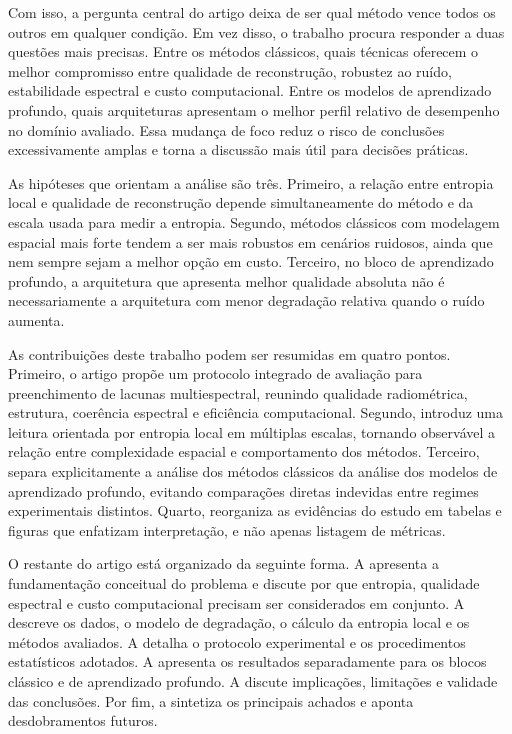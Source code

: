 Com isso, a pergunta central do artigo deixa de ser qual método vence todos os outros em qualquer condição.
Em vez disso, o trabalho procura responder a duas questões mais precisas.
Entre os métodos clássicos, quais técnicas oferecem o melhor compromisso entre qualidade de reconstrução, robustez ao ruído, estabilidade espectral e custo computacional.
Entre os modelos de aprendizado profundo, quais arquiteturas apresentam o melhor perfil relativo de desempenho no domínio avaliado.
Essa mudança de foco reduz o risco de conclusões excessivamente amplas e torna a discussão mais útil para decisões práticas.

As hipóteses que orientam a análise são três.
Primeiro, a relação entre entropia local e qualidade de reconstrução depende simultaneamente do método e da escala usada para medir a entropia.
Segundo, métodos clássicos com modelagem espacial mais forte tendem a ser mais robustos em cenários ruidosos, ainda que nem sempre sejam a melhor opção em custo.
Terceiro, no bloco de aprendizado profundo, a arquitetura que apresenta melhor qualidade absoluta não é necessariamente a arquitetura com menor degradação relativa quando o ruído aumenta.

As contribuições deste trabalho podem ser resumidas em quatro pontos.
Primeiro, o artigo propõe um protocolo integrado de avaliação para preenchimento de lacunas multiespectral, reunindo qualidade radiométrica, estrutura, coerência espectral e eficiência computacional.
Segundo, introduz uma leitura orientada por entropia local em múltiplas escalas, tornando observável a relação entre complexidade espacial e comportamento dos métodos.
Terceiro, separa explicitamente a análise dos métodos clássicos da análise dos modelos de aprendizado profundo, evitando comparações diretas indevidas entre regimes experimentais distintos.
Quarto, reorganiza as evidências do estudo em tabelas e figuras que enfatizam interpretação, e não apenas listagem de métricas.

O restante do artigo está organizado da seguinte forma.
A  apresenta a fundamentação conceitual do problema e discute por que entropia, qualidade espectral e custo computacional precisam ser considerados em conjunto.
A  descreve os dados, o modelo de degradação, o cálculo da entropia local e os métodos avaliados.
A  detalha o protocolo experimental e os procedimentos estatísticos adotados.
A  apresenta os resultados separadamente para os blocos clássico e de aprendizado profundo.
A  discute implicações, limitações e validade das conclusões.
Por fim, a  sintetiza os principais achados e aponta desdobramentos futuros.

